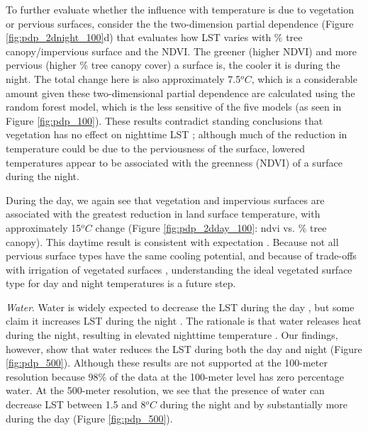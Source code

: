 \documentclass[review]{elsarticle}
\begin{document}
To further evaluate whether the influence with temperature is due to vegetation or pervious surfaces, consider the the two-dimension partial dependence (Figure \ref{fig:pdp_2dnight_100}d) that evaluates how LST varies with \% tree canopy/impervious surface and the NDVI.
The greener (higher NDVI) and more pervious (higher \% tree canopy cover) a surface is, the cooler it is during the night. 
The total change here is also approximately 7.5$^oC$, which is a considerable amount given these two-dimensional partial dependence are calculated using the random forest model, which is the less sensitive of the five models (as seen in Figure \ref{fig:pdp_100}).
These results contradict standing conclusions that vegetation has no effect on nighttime LST \cite{Peng2012-iy, Zhou2014-wc};
although much of the reduction in temperature could be due to the perviousness of the surface, lowered temperatures appear to be associated with the greenness (NDVI) of a surface during the night.

During the day, we again see that vegetation and impervious surfaces are associated with the greatest reduction in land surface temperature, with approximately 15$^oC$ change (Figure \ref{fig:pdp_2dday_100}: ndvi vs. \% tree canopy). 
This daytime result is consistent with expectation \cite{Chun2017-mm, Peng2018-cp, Wang2019-tree,Zhou2014-wc, Chun2018-so}.
Because not all pervious surface types have the same cooling potential, and because of trade-offs with irrigation of vegetated surfaces \cite{Gober2009-im}, understanding the ideal vegetated surface type for day and night temperatures is a future step.

\textit{Water}.
Water is widely expected to decrease the LST during the day \cite{Wicki2017-fv, Zhou2018-iy, Wang2019-water}, but some claim it increases LST during the night \cite{Chun2017-mm}.
The rationale is that water releases heat during the night, resulting in elevated nighttime temperature \cite{Chun2017-mm}.
Our findings, however, show that water reduces the LST during both the day and night (Figure \ref{fig:pdp_500}).
Although these results are not supported at the 100-meter resolution because 98\% of the data at the 100-meter level has zero percentage water.
At the 500-meter resolution, we see that the presence of water can decrease LST between 1.5 and 8$^oC$ during the night and by substantially more during the day (Figure \ref{fig:pdp_500}).
\end{document}
